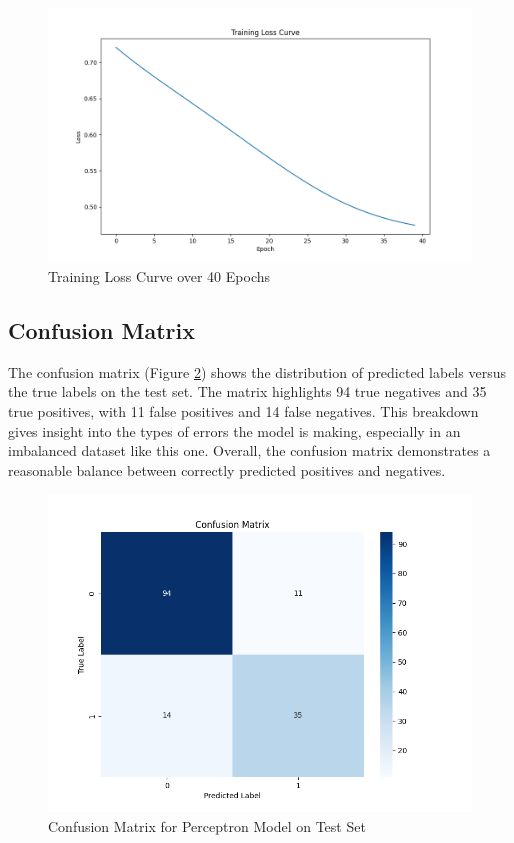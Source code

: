 \documentclass[10pt,twocolumn,letterpaper]{article}
\begin{document}
\begin{figure}[h]
    \centering
    \includegraphics[width=\linewidth]{loss_curve.png}
    \caption{Training Loss Curve over 40 Epochs}
    \label{fig:loss_curve}
\end{figure}

\subsection{Confusion Matrix}
The confusion matrix (Figure \ref{fig:confusion_matrix}) shows the distribution of predicted labels versus the true labels on the test set. The matrix highlights 94 true negatives and 35 true positives, with 11 false positives and 14 false negatives. This breakdown gives insight into the types of errors the model is making, especially in an imbalanced dataset like this one. Overall, the confusion matrix demonstrates a reasonable balance between correctly predicted positives and negatives.

\begin{figure}[h]
    \centering
    \includegraphics[width=\linewidth]{confusion_matrix.png}
    \caption{Confusion Matrix for Perceptron Model on Test Set}
    \label{fig:confusion_matrix}
\end{figure}
\end{document}
